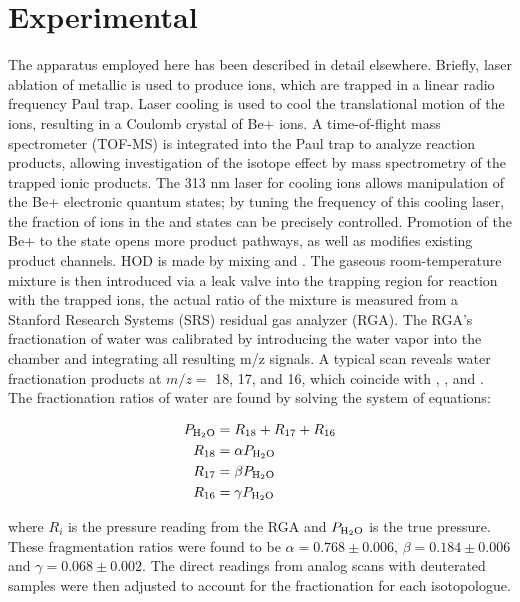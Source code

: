 \section{Experimental}

The apparatus employed here has been described in detail elsewhere. Briefly, laser ablation of metallic  is used to produce  ions, which are trapped in a linear radio frequency Paul trap. Laser cooling\cite{Wineland1979} is used to cool the translational motion of the ions, resulting in a Coulomb crystal of Be+ ions. A time-of-flight mass spectrometer (TOF-MS)\cite{Schowalter2012,Schneider2014,Puri2017,Paul1990} is integrated into the Paul trap to analyze reaction products, allowing investigation of the isotope effect by mass spectrometry of the trapped ionic products. The 313 nm laser for cooling  ions allows manipulation of the Be+ electronic quantum states; by tuning the frequency of this cooling laser, the fraction of ions in the  and  states can be precisely controlled. Promotion of the Be+ to the  state opens more product pathways, as well as modifies existing product channels. HOD is made by mixing  and .\cite{Pyper1967,Zhou2013} The gaseous room-temperature  mixture is then introduced
via a leak valve into the trapping region for reaction with the trapped ions, the actual ratio of the mixture is measured from a Stanford Research Systems (SRS) residual gas analyzer (RGA). The RGA’s fractionation of water was calibrated by introducing the water vapor into the chamber and integrating all resulting m/z signals.
A typical scan reveals water fractionation products at $m/z =$ 18, 17, and 16, which coincide with , , and . The fractionation ratios of water are found by solving the system of equations:

\begin{align}
	P_{\ce{H2O}} & = R_{18} + R_{17} + R_{16} \\
	R_{18} & = \alpha P_{\ce{H2O}} \\
	R_{17} & = \beta P_{\ce{H2O}} \\
	R_{16} & = \gamma P_{\ce{H2O}}
\end{align}

where $R_i$ is the pressure reading from the RGA and $P_{\ce{H2O}}$ is the true  pressure. These fragmentation ratios were found to be $\alpha = 0.768 \pm 0.006$, $\beta = 0.184 \pm 0.006$ and $\gamma = 0.068 \pm 0.002$. The
direct readings from analog scans with deuterated samples were then adjusted to account for the fractionation for each isotopologue.


